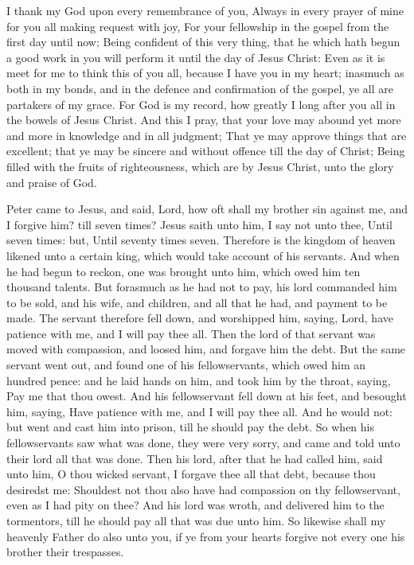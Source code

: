  I thank my God upon every remembrance of you, Always in every prayer of mine for you all making request with joy, For your fellowship in the gospel from the first day until now; Being confident of this very thing, that he which hath begun a good work in you will perform it until the day of Jesus Christ: Even as it is meet for me to think this of you all, because I have you in my heart; inasmuch as both in my bonds, and in the defence and confirmation of the gospel, ye all are partakers of my grace. For God is my record, how greatly I long after you all in the bowels of Jesus Christ. And this I pray, that your love may abound yet more and more in knowledge and in all judgment; That ye may approve things that are excellent; that ye may be sincere and without offence till the day of Christ; Being filled with the fruits of righteousness, which are by Jesus Christ, unto the glory and praise of God.


 Peter came to Jesus, and said, Lord, how oft shall my brother sin against me, and I forgive him? till seven times? Jesus saith unto him, I say not unto thee, Until seven times: but, Until seventy times seven. Therefore is the kingdom of heaven likened unto a certain king, which would take account of his servants. And when he had begun to reckon, one was brought unto him, which owed him ten thousand talents. But forasmuch as he had not to pay, his lord commanded him to be sold, and his wife, and children, and all that he had, and payment to be made. The servant therefore fell down, and worshipped him, saying, Lord, have patience with me, and I will pay thee all. Then the lord of that servant was moved with compassion, and loosed him, and forgave him the debt. But the same servant went out, and found one of his fellowservants, which owed him an hundred pence: and he laid hands on him, and took him by the throat, saying, Pay me that thou owest. And his fellowservant fell down at his feet, and besought him, saying, Have patience with me, and I will pay thee all. And he would not: but went and cast him into prison, till he should pay the debt. So when his fellowservants saw what was done, they were very sorry, and came and told unto their lord all that was done. Then his lord, after that he had called him, said unto him, O thou wicked servant, I forgave thee all that debt, because thou desiredst me: Shouldest not thou also have had compassion on thy fellowservant, even as I had pity on thee? And his lord was wroth, and delivered him to the tormentors, till he should pay all that was due unto him. So likewise shall my heavenly Father do also unto you, if ye from your hearts forgive not every one his brother their trespasses.

